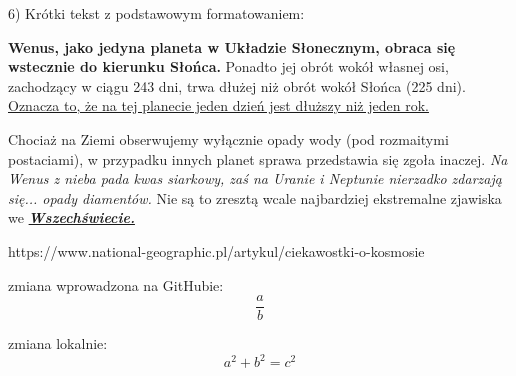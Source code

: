 6) Krótki tekst z podstawowym formatowaniem:

\textbf{Wenus, jako jedyna planeta w Układzie Słonecznym, obraca się wstecznie do kierunku Słońca.} Ponadto jej obrót wokół własnej osi, zachodzący w ciągu 243 dni, trwa dłużej niż obrót wokół Słońca (225 dni). \underline{Oznacza to, że na tej planecie jeden dzień jest dłuższy niż jeden rok.}

Chociaż na Ziemi obserwujemy wyłącznie opady wody (pod rozmaitymi postaciami), w przypadku innych planet sprawa przedstawia się zgoła inaczej. \textit{Na Wenus z nieba pada kwas siarkowy, zaś na Uranie i Neptunie nierzadko zdarzają się... opady diamentów.} Nie są to zresztą wcale najbardziej ekstremalne zjawiska we \textbf{\textit{\underline{Wszechświecie.}}}
 
\begingroup
\raggedleft
https://www.national-geographic.pl/artykul/ciekawostki-o-kosmosie
\endgroup



zmiana wprowadzona na GitHubie: \[\frac{a}{b}\]



zmiana lokalnie:  \[a^{2}+b^{2}=c^{2}\]
